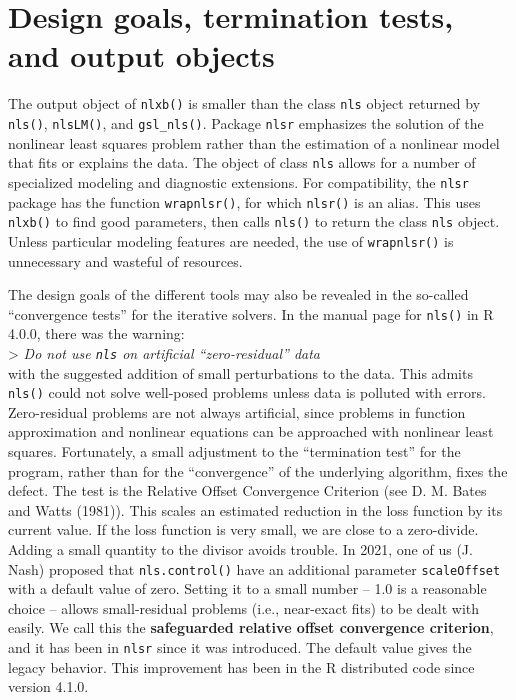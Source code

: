 \hypertarget{design-goals-termination-tests-and-output-objects}{%
\section{Design goals, termination tests, and output objects}\label{design-goals-termination-tests-and-output-objects}}

The output object of \texttt{nlxb()} is smaller than the class \texttt{nls} object returned
by \texttt{nls()}, \texttt{nlsLM()}, and \texttt{gsl\_nls()}. Package \texttt{nlsr} emphasizes the solution
of the nonlinear least squares problem rather than the estimation of a nonlinear
model that fits or explains the data. The object of class \texttt{nls} allows for
a number of specialized modeling and diagnostic extensions. For compatibility,
the \texttt{nlsr} package has the function \texttt{wrapnlsr()}, for which \texttt{nlsr()} is an alias.
This uses \texttt{nlxb()} to find good parameters, then calls \texttt{nls()} to return the class
\texttt{nls} object. Unless particular modeling features are needed, the use of
\texttt{wrapnlsr()} is unnecessary and wasteful of resources.

The design goals of the different tools may also be revealed in the so-called
``convergence tests'' for the iterative solvers. In the manual page for \texttt{nls()}
in R 4.0.0, there was the warning:\\
\textgreater{} \emph{Do not use \texttt{nls} on artificial ``zero-residual'' data}\\
with the suggested addition of small perturbations to the data. This admits
\texttt{nls()} could not solve well-posed problems unless data is polluted
with errors. Zero-residual problems are not always artificial,
since problems in function approximation and nonlinear equations can be
approached with nonlinear least squares. Fortunately, a small adjustment
to the ``termination test'' for the program, rather than for the
``convergence'' of the underlying algorithm, fixes the defect. The test
is the Relative Offset Convergence
Criterion (see D. M. Bates and Watts (1981)). This scales an estimated reduction in the loss
function by its current value. If the loss function is very small, we are close
to a zero-divide. Adding a small quantity to the divisor avoids trouble.
In 2021, one of us (J. Nash) proposed that \texttt{nls.control()} have an
additional parameter \texttt{scaleOffset} with a default value of zero. Setting it to a
small number -- 1.0 is a reasonable choice -- allows small-residual problems
(i.e., near-exact fits) to be dealt with easily. We call this the
\textbf{safeguarded relative offset convergence criterion}, and it has been in \texttt{nlsr}
since it was introduced. The default value
gives the legacy behavior. This improvement has been in the R distributed code
since version 4.1.0.

